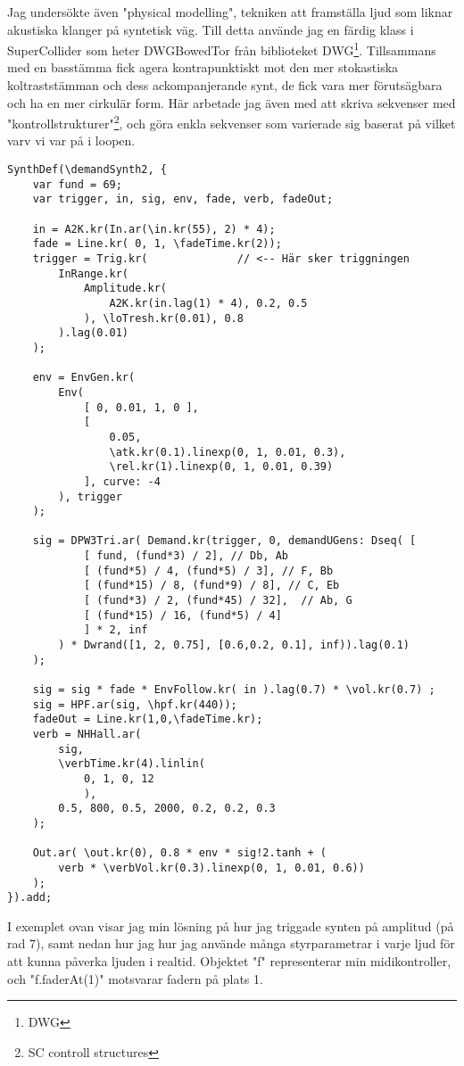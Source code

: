 \documentclass{article}
\renewcommand{\baselinestretch}{1.5}
\begin{document}

	Jag undersökte även "physical modelling", tekniken att framställa ljud som liknar akustiska klanger på
	syntetisk väg. Till detta använde jag en färdig klass i SuperCollider som heter DWGBowedTor från
	biblioteket DWG\footnote{DWG}. Tillsammans med en basstämma fick agera kontrapunktiskt mot den mer
	stokastiska koltraststämman och dess ackompanjerande synt, de fick vara mer förutsägbara och ha en mer
	cirkulär form. Här arbetade jag även med att skriva sekvenser med "kontrollstrukturer"\footnote{SC
	controll structures}, och göra enkla sekvenser som varierade sig baserat på vilket varv vi var på i
	loopen. 
	\pagebreak

\renewcommand{\baselinestretch}{1}
\begin{lstlisting}[style=SuperCollider-IDE, caption=Amplitudtriggad synt]
SynthDef(\demandSynth2, {
	var fund = 69;
	var trigger, in, sig, env, fade, verb, fadeOut;

	in = A2K.kr(In.ar(\in.kr(55), 2) * 4);
	fade = Line.kr( 0, 1, \fadeTime.kr(2));
	trigger = Trig.kr(			    // <-- Här sker triggningen
		InRange.kr( 
			Amplitude.kr(
				A2K.kr(in.lag(1) * 4), 0.2, 0.5
			), \loTresh.kr(0.01), 0.8 
		).lag(0.01)
	);

	env = EnvGen.kr(
		Env( 
			[ 0, 0.01, 1, 0 ],
			[
				0.05,
				\atk.kr(0.1).linexp(0, 1, 0.01, 0.3),
				\rel.kr(1).linexp(0, 1, 0.01, 0.39) 
			], curve: -4
		), trigger
	);

	sig = DPW3Tri.ar( Demand.kr(trigger, 0, demandUGens: Dseq( [ 
			[ fund, (fund*3) / 2], // Db, Ab
			[ (fund*5) / 4, (fund*5) / 3], // F, Bb
			[ (fund*15) / 8, (fund*9) / 8], // C, Eb
			[ (fund*3) / 2, (fund*45) / 32],  // Ab, G
			[ (fund*15) / 16, (fund*5) / 4]
			] * 2, inf
		) * Dwrand([1, 2, 0.75], [0.6,0.2, 0.1], inf)).lag(0.1)
	);

	sig = sig * fade * EnvFollow.kr( in ).lag(0.7) * \vol.kr(0.7) ;
	sig = HPF.ar(sig, \hpf.kr(440));
	fadeOut = Line.kr(1,0,\fadeTime.kr);
	verb = NHHall.ar(
		sig, 
		\verbTime.kr(4).linlin(
			0, 1, 0, 12
			), 
		0.5, 800, 0.5, 2000, 0.2, 0.2, 0.3
	);

	Out.ar( \out.kr(0), 0.8 * env * sig!2.tanh + ( 
		verb * \verbVol.kr(0.3).linexp(0, 1, 0.01, 0.6))
	);  
}).add;
\end{lstlisting}
\renewcommand{\baselinestretch}{1.5}


  I exemplet ovan visar jag min lösning på hur jag triggade synten på amplitud (på rad 7), samt nedan hur jag
  hur jag använde många styrparametrar i varje ljud för att kunna påverka ljuden i realtid. Objektet "f"
  representerar min midikontroller, och "f.faderAt(1)" motsvarar fadern på plats 1.
\end{document}
